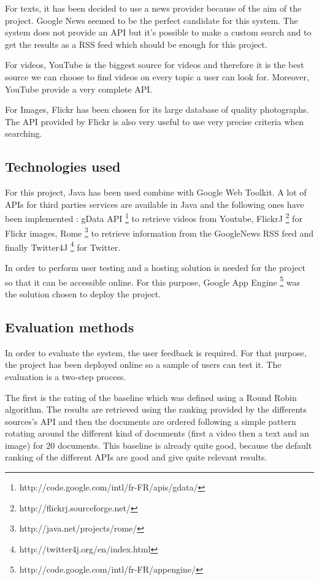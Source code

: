 \documentclass{acmsmall}
\begin{document}
For texts, it has been decided to use a news provider because of the aim of the project. Google News seemed to be the perfect candidate for this system. The system does not provide an API but it's possible to make a custom search and to get the results as a RSS feed which should be enough for this project.

For videos, YouTube is the biggest source for videos and therefore it is the best source we can choose to find videos on every topic a user can look for. Moreover, YouTube provide a very complete API.

For Images, Flickr has been chosen for its large database of quality photographs. The API provided by Flickr is also very useful to use very precise criteria when searching.


\subsection{Technologies used}
For this project, Java has been used combine with Google Web Toolkit. A lot of APIs for third parties services are available in Java and the following ones have been implemented : gData API \footnote{http://code.google.com/intl/fr-FR/apis/gdata/} to retrieve videos from Youtube, FlickrJ \footnote{http://flickrj.sourceforge.net/} for Flickr images, Rome \footnote{http://java.net/projects/rome/} to retrieve information from the GoogleNews RSS feed and finally Twitter4J \footnote{http://twitter4j.org/en/index.html} for Twitter.

In order to perform user testing and a hosting solution is needed for the project so that it can be accessible online. For this purpose, Google App Engine \footnote{http://code.google.com/intl/fr-FR/appengine/} was the solution chosen to deploy the project. 

\subsection{Evaluation methods}
In order to evaluate the system, the user feedback is required. For that purpose, the project has been deployed online so a sample of users can test it. The evaluation is a two-step process. 

The first is the rating of the baseline which was defined using a Round Robin algorithm. The results are retrieved using the ranking provided by the differents sources's API and then the documents are ordered following a simple pattern rotating around the different kind of documents (first a video then a text and an image) for 20 documents. This baseline is already quite good, because the default ranking of the different APIs are good and give quite relevant results.
\end{document}
